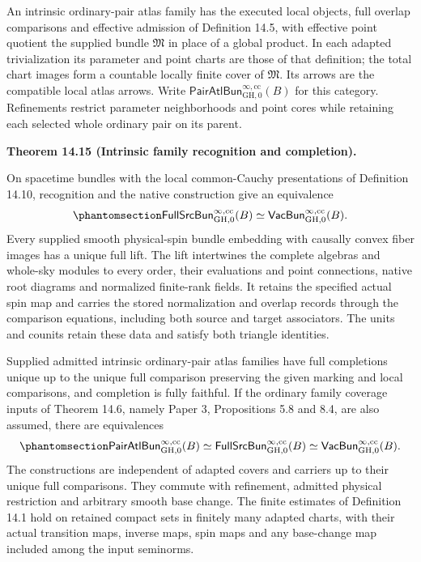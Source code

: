 \documentclass[
  english,
  11pt,
  reqno]{amsart}
\makeatletter
\newcommand{\pandocstatementheading}[1]{%
  \par\addpenalty{\@beginparpenalty}%
  \addvspace{.5\baselineskip plus .2\baselineskip minus .2\baselineskip}%
  {\normalfont\bfseries #1\par}%
  \nobreak\@afterindenttrue\@afterheading
}
\makeatother
\begin{document}
An intrinsic ordinary-pair atlas family has the executed local objects,
full overlap comparisons and effective admission of Definition 14.5,
with effective point quotient the supplied bundle \(\mathfrak M\) in
place of a global product. In each adapted trivialization its parameter
and point charts are those of that definition; the total chart images
form a countable locally finite cover of \(\mathfrak M\). Its arrows are
the compatible local atlas arrows. Write
\(\mathsf{PairAtlBun}^{\infty,\mathrm{cc}}_{\mathrm{GH},0}(B)\) for this
category. Refinements restrict parameter neighborhoods and point cores
while retaining each selected whole ordinary pair on its parent.

\pandocstatementheading{\protect{}\label{thm:intrinsic-full-family-correspondence}Theorem 14.15 (Intrinsic family recognition and completion).}

On spacetime bundles with the local common-Cauchy presentations of
Definition 14.10, recognition and the native construction give an
equivalence
\begin{equation}\protect\phantomsection\label{eq:intrinsic-full-family-equivalence}{
\mathsf{FullSrcBun}^{\infty,\mathrm{cc}}_{\mathrm{GH},0}(B)
\simeq
\mathsf{VacBun}^{\infty,\mathrm{cc}}_{\mathrm{GH},0}(B).
}\end{equation} Every supplied smooth physical-spin bundle embedding
with causally convex fiber images has a unique full lift. The lift
intertwines the complete algebras and whole-sky modules to every order,
their evaluations and point connections, native root diagrams and
normalized finite-rank fields. It retains the specified actual spin map
and carries the stored normalization and overlap records through the
comparison equations, including both source and target associators. The
units and counits retain these data and satisfy both triangle
identities.

Supplied admitted intrinsic ordinary-pair atlas families have full
completions unique up to the unique full comparison preserving the given
marking and local comparisons, and completion is fully faithful. If the
ordinary family coverage inputs of Theorem 14.6, namely Paper 3,
Propositions 5.8 and 8.4, are also assumed, there are equivalences
\begin{equation}\protect\phantomsection\label{eq:intrinsic-family-three-correspondences}{
\mathsf{PairAtlBun}^{\infty,\mathrm{cc}}_{\mathrm{GH},0}(B)
\simeq
\mathsf{FullSrcBun}^{\infty,\mathrm{cc}}_{\mathrm{GH},0}(B)
\simeq
\mathsf{VacBun}^{\infty,\mathrm{cc}}_{\mathrm{GH},0}(B).
}\end{equation} The constructions are independent of adapted covers and
carriers up to their unique full comparisons. They commute with
refinement, admitted physical restriction and arbitrary smooth base
change. The finite estimates of Definition 14.1 hold on retained compact
sets in finitely many adapted charts, with their actual transition maps,
inverse maps, spin maps and any base-change map included among the input
seminorms.
\end{document}
